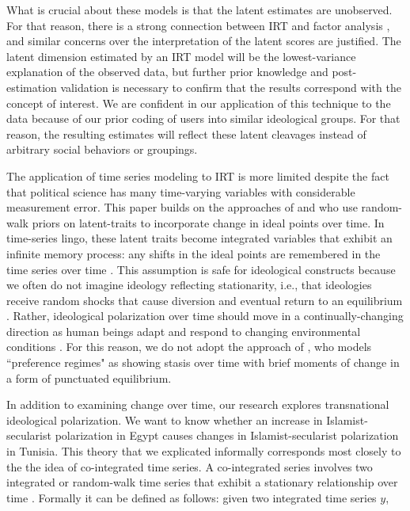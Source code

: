 \documentclass[12pt]{article}
\begin{document}
What is crucial about these models is that the latent estimates are unobserved. For that reason, there is a strong connection between IRT and factor analysis \parencite{takane1986}, and similar concerns over the interpretation of the latent scores are justified. The latent dimension estimated by an IRT model will be the lowest-variance explanation of the observed data, but further prior knowledge and post-estimation validation is necessary to confirm that the results correspond with the concept of interest. We are confident in our application of this technique to the data because of our prior coding of users into similar ideological groups. For that reason, the resulting estimates will reflect these latent cleavages instead of arbitrary social behaviors or groupings.

The application of time series modeling to IRT is more limited despite the fact that political science has many time-varying variables with considerable measurement error. This paper builds on the approaches of \textcite{quinn2002} and \textcite{kropko2013} who use random-walk priors on latent-traits to incorporate change in ideal points over time. In time-series lingo, these latent traits become integrated variables that exhibit an infinite memory process: any shifts in the ideal points are remembered in the time series over time \parencite[Ch. 5]{timeseries2014}. This assumption is safe for ideological constructs because we often do not imagine ideology reflecting stationarity, i.e., that ideologies receive random shocks that cause diversion and eventual return to an equilibrium \parencite[Ch. 2]{timeseries2014}. Rather, ideological polarization over time should move in a continually-changing direction as human beings adapt and respond to changing environmental conditions \parencite{owen2010clash}. For this reason, we do not adopt the approach of \textcite{park2011}, who models ``preference regimes" as showing stasis over time with brief moments of change in a form of punctuated equilibrium.

In addition to examining change over time, our research explores transnational ideological polarization. We want to know whether an increase in Islamist-secularist polarization in Egypt causes changes in Islamist-secularist polarization in Tunisia. This theory that we explicated informally corresponds most closely to the the idea of co-integrated time series. A co-integrated series involves two integrated or random-walk time series that exhibit a stationary relationship over time \parencite{engle1987}. Formally it can be defined as follows: given two integrated time series  $y$,
\end{document}
